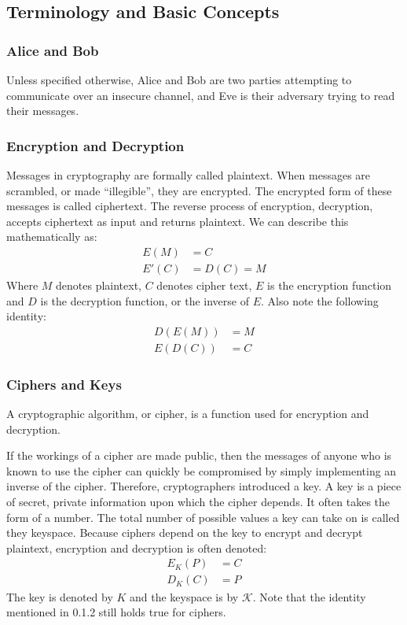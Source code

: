\documentclass[12pt, a4paper, draft]{report}
\begin{document}
\subsection{Terminology and Basic Concepts}

\subsubsection{Alice and Bob}
Unless specified otherwise, Alice and Bob are two parties attempting to
communicate over an insecure channel, and Eve is their adversary trying to
read their messages.

\subsubsection{Encryption and Decryption}

Messages in cryptography are formally called plaintext. When messages are
scrambled, or made ``illegible'', they are encrypted. The encrypted form
of these messages is called ciphertext. The reverse process of encryption,
decryption, accepts ciphertext as input and returns plaintext. We can
describe this mathematically as:
\begin{align*}
    E(M) & = C\\
    E'(C) & = D(C) = M
\end{align*}
Where $M$ denotes plaintext, $C$ denotes cipher text, $E$ is the encryption
function and $D$ is the decryption function, or the inverse of $E$. Also
note the following identity:
\begin{align*}
    D(E(M)) & = M\\
    E(D(C)) & = C
\end{align*}

\subsubsection{Ciphers and Keys}

A cryptographic algorithm, or cipher, is a function used for encryption
and decryption.

If the workings of a cipher are made public, then the messages
of anyone who is known to use the cipher can quickly be compromised
by simply implementing an inverse of the cipher. Therefore, cryptographers
introduced a key. A key is a piece of secret, private information
upon which the cipher depends. It often takes the form of a number.
The total number of possible values a key can take on is called they
keyspace. Because ciphers depend on the key to encrypt and decrypt
plaintext, encryption and decryption is often denoted:
\begin{align*}
    E_K(P) & = C\\
    D_K(C) & = P
\end{align*}
The key is denoted by $K$ and the keyspace is by $\mathcal{K}$. Note that
the identity mentioned in 0.1.2 still holds true for ciphers.
\end{document}

